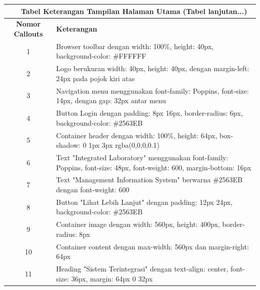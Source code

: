 \begin{enumerate}
\begin{longtable}{c p{}}
		      \multicolumn{2}{c}{\small\tablename\ \thetable\ {Tabel Keterangan Tampilan Halaman Utama} \space (Tabel lanjutan...)}                           \\
		      \hline
		      \textbf{Nomor Callouts} & \textbf{Keterangan}                                                                                                   \\
		      \hline
		      \endhead

		      1                       & Browser toolbar dengan width: 100\%, height: 40px, background-color: \#FFFFFF                                         \\
		      2                       & Logo berukuran width: 40px, height: 40px, dengan margin-left: 24px pada pojok kiri atas                               \\
		      3                       & Navigation menu menggunakan font-family: Poppins, font-size: 14px, dengan gap: 32px antar menu                        \\
		      4                       & Button Login dengan padding: 8px 16px, border-radius: 6px, background-color: \#2563EB                                 \\
		      5                       & Container header dengan width: 100\%, height: 64px, box-shadow: 0 1px 3px rgba(0,0,0,0.1)                             \\
		      6                       & Text "Integrated Laboratory" menggunakan font-family: Poppins, font-size: 48px, font-weight: 600, margin-bottom: 16px \\
		      7                       & Text "Management Information System" berwarna \#2563EB dengan font-weight: 600                                        \\
		      8                       & Button "Lihat Lebih Lanjut" dengan padding: 12px 24px, background-color: \#2563EB                                     \\
		      9                       & Container image dengan width: 560px, height: 400px, border-radius: 8px                                                \\
		      10                      & Container content dengan max-width: 560px dan margin-right: 64px                                                      \\
		      11                      & Heading "Sistem Terintegrasi" dengan text-align: center, font-size: 36px, margin: 64px 0 32px                         \\

\end{longtable}
\end{enumerate}

